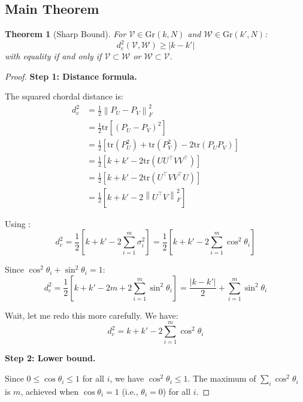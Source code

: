 \documentclass[11pt,a4paper]{article}
\newtheorem{theorem}{Theorem}[section]
\newcommand{\Gr}{\mathrm{Gr}}
\newcommand{\tr}{\mathrm{tr}}
\newcommand{\norm}[1]{\left\|#1\right\|}
\begin{document}
\subsection{Main Theorem}

\begin{theorem}[Sharp Bound]
For $\mathcal{V} \in \Gr(k,N)$ and $\mathcal{W} \in \Gr(k',N)$:
\begin{equation}
    d_c^2(\mathcal{V}, \mathcal{W}) \geq |k - k'|
\end{equation}
with equality if and only if $\mathcal{V} \subset \mathcal{W}$ or $\mathcal{W} \subset \mathcal{V}$.
\end{theorem}

\begin{proof}
\textbf{Step 1: Distance formula.}

The squared chordal distance is:
\begin{align}
    d_c^2 &= \frac{1}{2}\norm{P_U - P_V}_F^2 \\
    &= \frac{1}{2}\tr\left[(P_U - P_V)^2\right] \\
    &= \frac{1}{2}\left[\tr(P_U^2) + \tr(P_V^2) - 2\tr(P_U P_V)\right] \\
    &= \frac{1}{2}\left[k + k' - 2\tr(UU^\top VV^\top)\right] \\
    &= \frac{1}{2}\left[k + k' - 2\tr(U^\top VV^\top U)\right] \\
    &= \frac{1}{2}\left[k + k' - 2\norm{U^\top V}_F^2\right]
\end{align}

Using :
\begin{equation}
    d_c^2 = \frac{1}{2}\left[k + k' - 2\sum_{i=1}^m \sigma_i^2\right] = \frac{1}{2}\left[k + k' - 2\sum_{i=1}^m \cos^2\theta_i\right]
\end{equation}

Since $\cos^2\theta_i + \sin^2\theta_i = 1$:
\begin{equation}
    d_c^2 = \frac{1}{2}\left[k + k' - 2m + 2\sum_{i=1}^m \sin^2\theta_i\right] = \frac{|k-k'|}{2} + \sum_{i=1}^m \sin^2\theta_i
\end{equation}

Wait, let me redo this more carefully. We have:
\begin{equation}
    d_c^2 = k + k' - 2\sum_{i=1}^m \cos^2\theta_i
\end{equation}

\textbf{Step 2: Lower bound.}

Since $0 \leq \cos\theta_i \leq 1$ for all $i$, we have $\cos^2\theta_i \leq 1$. The maximum of $\sum_i \cos^2\theta_i$ is $m$, achieved when $\cos\theta_i = 1$ (i.e., $\theta_i = 0$) for all $i$.


\end{proof}
\end{document}
